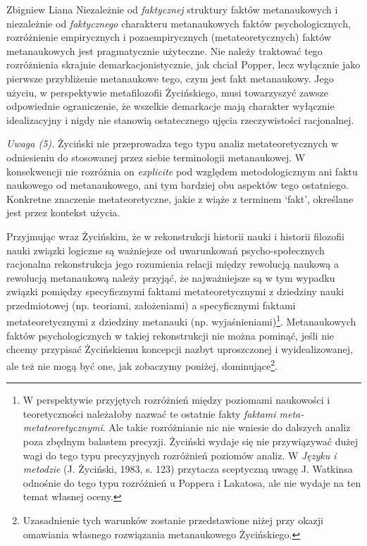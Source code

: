 \begin{artplenv}{Zbigniew Liana}
Niezależnie od \textit{faktycznej} struktury faktów metanaukowych i niezależnie od \textit{faktycznego} charakteru
metanaukowych faktów psychologicznych, rozróżnienie empirycznych i pozaempirycznych (metateoretycznych) faktów
metanaukowych jest pragmatycznie użyteczne. Nie należy traktować tego rozróżnienia skrajnie demarkacjonistycznie, jak
chciał Popper, lecz wyłącznie jako pierwsze przybliżenie metanaukowe tego, czym jest fakt metanaukowy. Jego użyciu, w perspektywie
metafilozofii Życińskiego, musi towarzyszyć zawsze odpowiednie ograniczenie, że wszelkie demarkacje mają
charakter wyłącznie idealizacyjny i nigdy nie stanowią ostatecznego ujęcia rzeczywistości racjonalnej.

\textit{Uwaga (5).} Życiński nie przeprowadza tego typu analiz metateoretycznych w odniesieniu do stosowanej przez siebie
terminologii metanaukowej. W konsekwencji nie rozróżnia on \textit{explicite} pod względem metodologicznym ani faktu
naukowego od metanaukowego, ani tym bardziej obu aspektów tego ostatniego. Konkretne znaczenie metateoretyczne,
jakie z wiąże z terminem `fakt', określane jest przez kontekst użycia.

Przyjmując wraz Życińskim, że w rekonstrukcji historii nauki i historii filozofii nauki związki logiczne są ważniejsze
od uwarunkowań psycho-społecznych racjonalna rekonstrukcja jego rozumienia relacji między rewolucją naukową a rewolucją
metanaukową należy przyjąć, że najważniejsze są w tym wypadku związki pomiędzy specyficznymi faktami
metateoretycznymi z dziedziny nauki przedmiotowej (np. teoriami, założeniami) a specyficznymi faktami metateoretycznymi z dziedziny
metanauki (np. wyjaśnieniami)\footnote{W perspektywie przyjętych rozróżnień między poziomami naukowości i teoretyczności
należałoby nazwać te ostatnie fakty \textit{faktami meta-metateoretycznymi}. Ale takie rozróżnianie nic
nie wniesie do dalszych analiz poza zbędnym balastem precyzji. Życiński wydaje się nie przywiązywać dużej wagi do tego
typu precyzyjnych rozróżnień poziomów analiz. W \textit{Języku i metodzie} \label{ref:RNDqQTlKikSxt}(J. Życiński, 1983,
s. 123) przytacza sceptyczną uwagę J. Watkinsa odnośnie do tego typu rozróżnień u Poppera i Lakatosa, ale nie wydaje na
ten temat własnej oceny.}. Metanaukowych faktów psychologicznych w takiej rekonstrukcji nie można pominąć, jeśli nie
chcemy przypisać Życińskiemu koncepcji nazbyt uproszczonej i wyidealizowanej, ale też nie mogą być one, jak zobaczymy
poniżej, dominujące\footnote{Uzasadnienie tych warunków zostanie przedstawione niżej przy okazji omawiania własnego
rozwiązania metanaukowego Życińskiego.}.


\end{artplenv}
